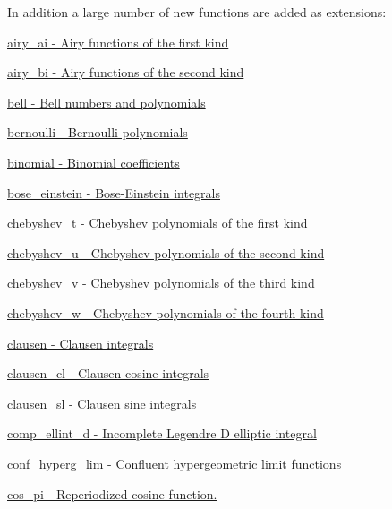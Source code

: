 In addition a large number of new functions are added as extensions\+:
\begin{DoxyItemize}
\item \hyperlink{group__mathsf__gnu_gac84f8c4ad00ee677ad4d0b785925d983}{airy\+\_\+ai -\/ Airy functions of the first kind}
\item \hyperlink{group__mathsf__gnu_ga33c172cab7f8e9c99537444c7e30801a}{airy\+\_\+bi -\/ Airy functions of the second kind}
\item \hyperlink{group__mathsf__gnu_gac07286d722248a7f3c65a13b49b1fef5}{bell -\/ Bell numbers and polynomials}
\item \hyperlink{group__mathsf__gnu_gad339f0011df1967ec6c9e55bd1547bf4}{bernoulli -\/ Bernoulli polynomials}
\item \hyperlink{group__mathsf__gnu_gabd0cf6e3f1e1d36c4c45f118e34a5ca2}{binomial -\/ Binomial coefficients}
\item \hyperlink{group__mathsf__gnu_gae8135b6861a48f2cee2e692093a17102}{bose\+\_\+einstein -\/ Bose-\/\+Einstein integrals}
\item \hyperlink{group__mathsf__gnu_ga4d9cae9de13a64ceeb4fb0226f4b7844}{chebyshev\+\_\+t -\/ Chebyshev polynomials of the first kind}
\item \hyperlink{group__mathsf__gnu_gafa90c06bdedb8459f20576297cf1608f}{chebyshev\+\_\+u -\/ Chebyshev polynomials of the second kind}
\item \hyperlink{group__mathsf__gnu_ga32b7decd0002f542d2c9187c5f0846c6}{chebyshev\+\_\+v -\/ Chebyshev polynomials of the third kind}
\item \hyperlink{group__mathsf__gnu_gaa156c6c21e99104ebcb627e92aceada0}{chebyshev\+\_\+w -\/ Chebyshev polynomials of the fourth kind}
\item \hyperlink{group__mathsf__gnu_ga54e4ba71b1f81718d6998349f91ff88f}{clausen -\/ Clausen integrals}
\item \hyperlink{group__mathsf__gnu_ga8786b86db309998f93f877cfb9bdfd57}{clausen\+\_\+cl -\/ Clausen cosine integrals}
\item \hyperlink{group__mathsf__gnu_gacb757b00309213cd96bb2bc6b5dc3c24}{clausen\+\_\+sl -\/ Clausen sine integrals}
\item \hyperlink{group__mathsf__gnu_ga3fe79a91524b43ffc5ffb83c0eb2bd00}{comp\+\_\+ellint\+\_\+d -\/ Incomplete Legendre D elliptic integral}
\item \hyperlink{group__mathsf__gnu_ga9fe7a5e2e741f56d88fd29bc249feab2}{conf\+\_\+hyperg\+\_\+lim -\/ Confluent hypergeometric limit functions}
\item \hyperlink{group__mathsf__gnu_gafc4698ae591b0e9e61285b0794d43ef4}{cos\+\_\+pi -\/ Reperiodized cosine function.}

\end{DoxyItemize}
